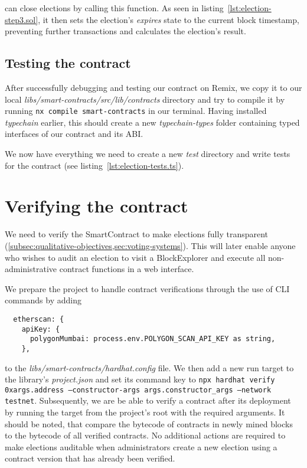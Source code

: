  can close elections by calling this function.
As seen in listing~\ref{lst:election-step3.sol}, it then sets the election's \emph{expires} state to the current block timestamp, preventing further transactions and calculates the election's result.

\subsection{Testing the contract}\label{subsec:testing-the-contract}

After successfully debugging and testing our contract on Remix, we copy it to our local \emph{libs/smart-contracts/src/lib/contracts} directory and try to compile it by running \texttt{nx compile smart-contracts} in our terminal.
Having installed \emph{typechain} earlier, this should create a new \emph{typechain-types} folder containing typed interfaces of our contract and its \gls{ABI}.

We now have everything we need to create a new \emph{test} directory and write tests for the contract (see listing~\ref{lst:election-tests.ts}).


\section{Verifying the contract}\label{sec:verifying-the-contract}

We need to verify the \gls{SmartContract} to make elections fully transparent (\cref{subsec:qualitative-objectives,sec:voting-systems}).
This will later enable anyone who wishes to audit an election to visit a \gls{BlockExplorer} and execute all non-administrative contract functions in a web interface.

We prepare the project to handle contract verifications through the use of \gls{CLI} commands by adding

\begin{verbatim}
  etherscan: {
    apiKey: {
      polygonMumbai: process.env.POLYGON_SCAN_API_KEY as string,
    },
\end{verbatim}

to the \emph{libs/smart-contracts/hardhat.config} file.
We then add a new run target to the library's \emph{project.json} and set its command key to \texttt{npx hardhat verify 0x{args.address} --constructor-args {args.constructor_args} --network testnet}.
Subsequently, we are be able to verify a contract after its deployment by running the target from the project's root with the required arguments.
It should be noted, that  compare the bytecode of contracts in newly mined blocks to the bytecode of all verified contracts.
No additional actions are required to make elections auditable when administrators create a new election using a contract version that has already been verified.

